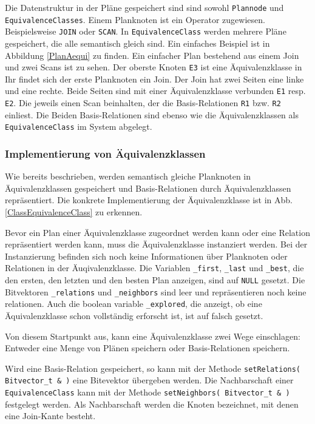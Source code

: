 Die Datenstruktur in der Pläne gespeichert sind sind sowohl \texttt{Plannode} und \texttt{EquivalenceClasses}. Einem Planknoten ist ein Operator zugewiesen. Beispielsweise \texttt{JOIN} oder \texttt{SCAN}. In \texttt{EquivalenceClass} werden mehrere Pläne gespeichert, die alle semantisch gleich sind. Ein einfaches Beispiel ist in Abbildung \ref{PlanAequi} zu finden. Ein einfacher Plan bestehend aus einem Join und zwei Scans ist zu sehen. Der oberste Knoten \texttt{E3} ist eine Äquivalenzklasse in Ihr findet sich der erste Planknoten ein Join. Der Join hat zwei Seiten eine linke und eine rechte. Beide Seiten sind mit einer Äquivalenzklasse verbunden \texttt{E1} resp. \texttt{E2}. Die jeweils einen Scan beinhalten, der die Basis-Relationen \texttt{R1} bzw. \texttt{R2} einliest. Die Beiden Basis-Relationen sind ebenso wie die Äquivalenzklassen als \texttt{EquivalenceClass} im System abgelegt.




\subsubsection{Implementierung von Äquivalenzklassen}

Wie bereits beschrieben, werden semantisch gleiche Planknoten in Äquivalenzklassen gespeichert und Basis-Relationen durch Äquivalenzklassen repräsentiert. Die konkrete Implementierung der Äquivalenzklasse ist in Abb. \ref{ClassEquivalenceClass} zu erkennen.

Bevor ein Plan einer Äquivalenzklasse zugeordnet werden kann oder eine Relation repräsentiert werden kann, muss die Äquivalenzklasse instanziert werden. Bei der Instanzierung befinden sich noch keine Informationen über Planknoten oder Relationen in der Äuqivalenzklasse. Die Variablen \texttt{\_first}, \texttt{\_last} und \texttt{\_best}, die den ersten, den letzten und den besten Plan anzeigen, sind auf \texttt{NULL} gesetzt. Die Bitvektoren \texttt{\_relations} und \texttt{\_neighbors} sind leer und repräsentieren noch keine relationen. Auch die boolean variable \texttt{\_explored}, die anzeigt, ob eine Äquivalenzklasse schon vollständig erforscht ist, ist auf falsch gesetzt.


Von diesem Startpunkt aus, kann eine Äquivalenzklasse zwei Wege einschlagen: Entweder eine Menge von Plänen speichern oder Basis-Relationen speichern. 

Wird eine Basis-Relation gespeichert, so kann mit der Methode \texttt{setRelations( Bitvector\_t \& )} eine Bitevektor übergeben werden. Die Nachbarschaft einer \texttt{EquivalenceClass} kann mit der Methode \texttt{setNeighbors( Bitvector\_t \& )} festgelegt werden. Als Nachbarschaft werden die Knoten bezeichnet, mit denen eine Join-Kante besteht.


